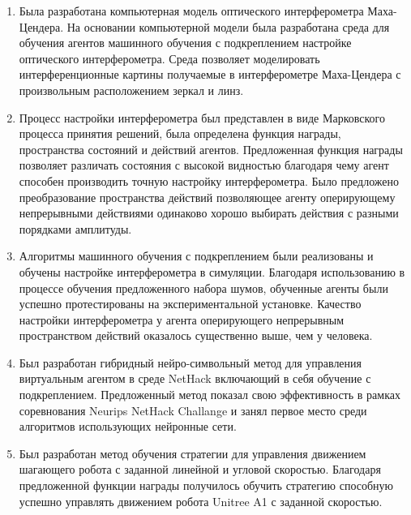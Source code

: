\begin{enumerate}
  \item Была разработана компьютерная модель оптического интерферометра Маха-Цендера. На основании компьютерной модели была разработана среда для обучения агентов машинного обучения с подкреплением настройке оптического интерферометра. Среда позволяет моделировать интерференционные картины получаемые в интерферометре Маха-Цендера с произвольным расположением зеркал и линз. 
  \item Процесс настройки интерферометра был представлен в виде Марковского процесса принятия решений, была определена функция награды, пространства состояний и действий агентов. Предложенная функция награды позволяет различать состояния с высокой видностью благодаря чему агент способен производить точную настройку интерферометра. Было предложено преобразование пространства действий позволяющее агенту оперирующему непрерывными действиями одинаково хорошо выбирать действия с разными порядками амплитуды. 
  \item Алгоритмы машинного обучения с подкреплением были реализованы и обучены настройке интерферометра в симуляции. Благодаря использованию в процессе обучения предложенного набора шумов, обученные агенты были успешно протестированы на экспериментальной установке. Качество настройки интерферометра у агента оперирующего непрерывным пространством действий оказалось существенно выше, чем у человека. 
  \item Был разработан гибридный нейро-символьный метод для управления виртуальным агентом в среде NetHack включающий в себя обучение с подкреплением. Предложенный метод показал свою эффективность в рамках соревнования Neurips NetHack Challange и занял первое место среди алгоритмов использующих нейронные сети.
  \item Был разработан метод обучения стратегии для управления движением шагающего робота с заданной линейной и угловой скоростью. Благодаря предложенной функции награды получилось обучить стратегию способную успешно управлять движением робота Unitree A1 с заданной скоростью. 
\end{enumerate}

\newpage
